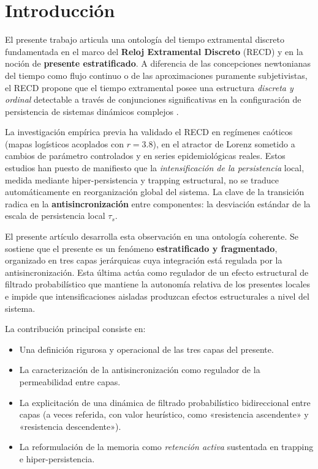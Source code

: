 \section{Introducción}

El presente trabajo articula una ontología del tiempo extramental discreto fundamentada en el marco del \textbf{Reloj Extramental Discreto} (RECD) y en la noción de \textbf{presente estratificado}. A diferencia de las concepciones newtonianas del tiempo como flujo continuo o de las aproximaciones puramente subjetivistas, el RECD propone que el tiempo extramental posee una estructura \textit{discreta y ordinal} detectable a través de conjunciones significativas en la configuración de persistencia de sistemas dinámicos complejos \citep{padilla_bayesian_accumulator_2026,padilla_sintesis_magna_2026}.

La investigación empírica previa ha validado el RECD en regímenes caóticos (mapas logísticos acoplados con $r=3.8$), en el atractor de Lorenz sometido a cambios de parámetro controlados y en series epidemiológicas reales. Estos estudios han puesto de manifiesto que la \textit{intensificación de la persistencia} local, medida mediante hiper-persistencia y trapping estructural, no se traduce automáticamente en reorganización global del sistema. La clave de la transición radica en la \textbf{antisincronización} entre componentes: la desviación estándar de la escala de persistencia local $\tau_s$.

El presente artículo desarrolla esta observación en una ontología coherente. Se sostiene que el presente es un fenómeno \textbf{estratificado y fragmentado}, organizado en tres capas jerárquicas cuya integración está regulada por la antisincronización. Esta última actúa como regulador de un efecto estructural de filtrado probabilístico que mantiene la autonomía relativa de los presentes locales e impide que intensificaciones aisladas produzcan efectos estructurales a nivel del sistema.

La contribución principal consiste en:
\begin{itemize}
    \item Una definición rigurosa y operacional de las tres capas del presente.
    \item La caracterización de la antisincronización como regulador de la permeabilidad entre capas.
    \item La explicitación de una dinámica de filtrado probabilístico bidireccional entre capas (a veces referida, con valor heurístico, como «resistencia ascendente» y «resistencia descendente»).
    \item La reformulación de la memoria como \textit{retención activa} sustentada en trapping e hiper-persistencia.
\end{itemize}

